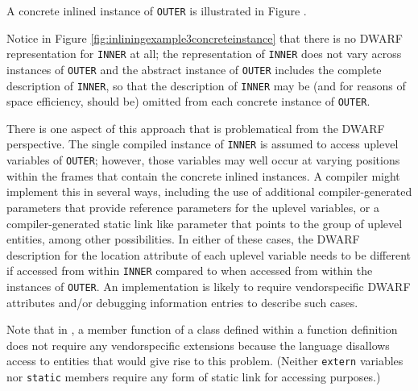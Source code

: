 A concrete inlined instance of \texttt{OUTER} is illustrated in
Figure .

Notice in 
Figure \ref{fig:inliningexample3concreteinstance}
that there is no DWARF representation for
\texttt{INNER} at all; the representation of \texttt{INNER} does not vary across
instances of \texttt{OUTER} and the abstract instance of \texttt{OUTER} includes
the complete description of \texttt{INNER}, so that the description of
\texttt{INNER} may be (and for reasons of space efficiency, should be)
omitted from each 
concrete instance of \texttt{OUTER}.

There is one aspect of this approach that is problematical from
the DWARF perspective. The single compiled instance of \texttt{INNER}
is assumed to access up\dash level variables of \texttt{OUTER}; however,
those variables may well occur at varying positions within
the frames that contain the 
concrete inlined instances. A
compiler might implement this in several ways, including the
use of additional compiler-generated parameters that provide
reference parameters for the up\dash level variables, or a 
compiler-generated static link like parameter that points to the group
of up\dash level entities, among other possibilities. In either of
these cases, the DWARF description for the location attribute
of each uplevel variable needs to be different if accessed
from within \texttt{INNER} compared to when accessed from within the
instances of \texttt{OUTER}. An implementation is likely to require
vendor\dash specific DWARF attributes and/or debugging information
entries to describe such cases.

Note that in , a member function of a class defined within
a function definition does not require any vendor\dash specific
extensions because the  language disallows access to
entities that would give rise to this problem. (Neither \texttt{extern}
variables nor \texttt{static} members require any form of static link
for accessing purposes.)

